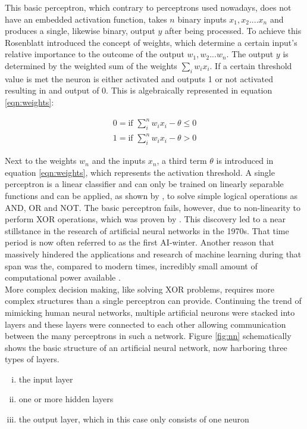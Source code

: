 This basic perceptron, which contrary to perceptrons used nowadays, does not have an
embedded activation function, takes $n$ binary inputs $x_1 , x_2 .... x_n$ and produces a
single, likewise binary, output $y$ after being processed. To achieve this Rosenblatt
introduced the concept of weights, which determine a certain input's relative importance
to the outcome of the output $w_1 , w_2 ... w_n$. The output $y$ is determined by the
weighted sum of the weights $\sum_i w_ix_i $. If a certain threshold value is met the
neuron is either activated and outputs 1 or not activated resulting in and output of
0. This is algebraically represented in equation \ref{eqn:weights}:

\begin{subequations}
 \begin{align}
  0 = \mbox{if } \sum_i^n w_i x_i - \theta \leq 0 \\
  1 = \mbox{if } \sum_i^n w_i x_i - \theta > 0
 \end{align}
 \label{eqn:weights}
\end{subequations}


Next to the weights $w_n$ and the inputs $x_n$, a third term $\theta$ is introduced in
equation \ref{eqn:weights}, which represents the activation threshold. A single perceptron
is a linear classifier and can only be trained on linearly separable functions and can be
applied, as shown by \cite{rosenblatt1961}, to solve simple logical operations as AND, OR
and NOT. The basic perceptron fails, however, due to non-linearity to perform XOR
operations, which was proven by \cite{marvin1969}. This discovery led to a near
stillstance in the research of artificial neural networks in the 1970s. That time period
is now often referred to as the first AI-winter. Another reason that massively hindered
the applications and research of machine learning during that span was the, compared to
modern times, incredibly small amount of computational power available \cite{nguyen1990truck}. \\
More complex decision making, like solving XOR problems, requires more complex structures
than a single perceptron can provide. Continuing the trend of mimicking human neural
networks, multiple artificial neurons were stacked into layers and these layers were
connected to each other allowing communication between the many perceptrons in such a
network. Figure \ref{fig:nn} schematically shows the basic structure of an artificial
neural network, now harboring three types of layers.
\begin{enumerate}[(i)]
\item the input layer
\item one or more hidden layers
\item the output layer, which in this case only consists of one neuron
\end{enumerate}


